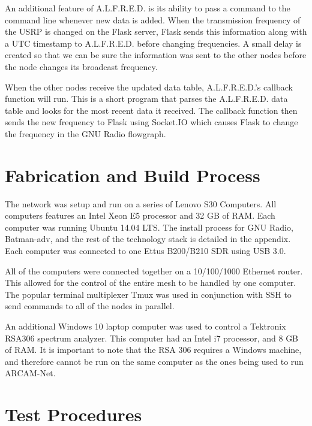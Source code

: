  An additional feature of A.L.F.R.E.D. is its ability to pass a command to the command line whenever new data is added. When the transmission frequency of the USRP is changed on the Flask server, Flask sends this information along with a UTC timestamp to A.L.F.R.E.D. before changing frequencies. A small delay is created so that we can be sure the information was sent to the other nodes before the node changes its broadcast frequency.  

 When the other nodes receive the updated data table, A.L.F.R.E.D.'s callback function will run. This is a short program that parses the A.L.F.R.E.D. data table and looks for the most recent data it received. The callback function then sends the new frequency to Flask using Socket.IO which causes Flask to change the frequency in the GNU Radio flowgraph.   

\section{Fabrication and Build Process}

The network was setup and run on a series of Lenovo S30 Computers. All computers features an Intel Xeon E5 processor and 32 GB of RAM. Each computer was running Ubuntu 14.04 LTS. The install process for GNU Radio, Batman-adv, and the rest of the technology stack is detailed in the appendix. Each computer was connected to one Ettus B200/B210 SDR using USB 3.0. 

All of the computers were connected together on a 10/100/1000 Ethernet router. This allowed for the control of the entire mesh to be handled by one computer. The popular terminal multiplexer Tmux was used in conjunction with SSH to send commands to all of the nodes in parallel. 

An additional Windows 10 laptop computer was used to control a Tektronix RSA306 spectrum analyzer. This computer had an Intel i7 processor, and 8 GB of RAM. It is important to note that the RSA 306 requires a Windows machine, and therefore cannot be run on the same computer as the ones being used to run ARCAM-Net.


\section{Test Procedures}

